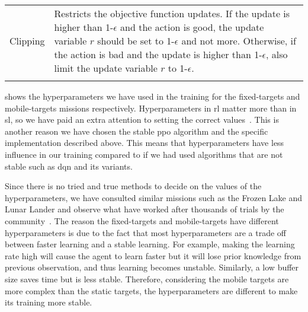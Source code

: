 \documentclass[../main.tex]{subfiles}
\begin{document}
\begin{table}[tb]
\begin{tabularx}{\textwidth}{ X p{12.3cm} }
        Clipping
                & 
                Restricts the objective function updates.
                If the update is higher than 1-$\epsilon$ and the
                action is good, the update variable $r$ should be set
                to 1-$\epsilon$ and not more.
                Otherwise, if the action is bad and the update is
                higher than 1-$\epsilon$, also limit the update
                variable $r$ to 1-$\epsilon$.
                \\ \addlinespace
        
        \bottomrule
    \end{tabularx}
\end{table}

 shows the hyperparameters we have used in
the training for the fixed-targets and mobile-targets missions
respectively.
Hyperparameters in \gls{rl} matter more than in \gls{sl}, so we have
paid an extra attention to setting the correct
values~\cite{hyperparameters}.
This is another reason we have chosen the stable \gls{ppo}
algorithm and the specific implementation described above.
This means that hyperparameters have less influence in our training
compared to if we had used algorithms that are not stable such as 
\gls{dqn} and its variants.

Since there is no tried and true methods to decide on the values of
the hyperparameters,  we have consulted similar missions such as the Frozen
Lake and Lunar Lander and observe what have worked after thousands of
trials by the community~\cite{rl-zoo3}.
The reason the fixed-targets and mobile-targets have different
hyperparameters is due to the fact that
most hyperparameters are a trade off between faster learning and a
stable learning.
For example, making the learning rate high will cause the agent to
learn faster but it will lose prior knowledge from previous
observation, and thus learning becomes unstable.
Similarly, a low buffer size saves time but is less stable. 
Therefore, considering the mobile targets are more complex than the
static targets, the hyperparameters are different to make its training
more stable.
\end{document}
